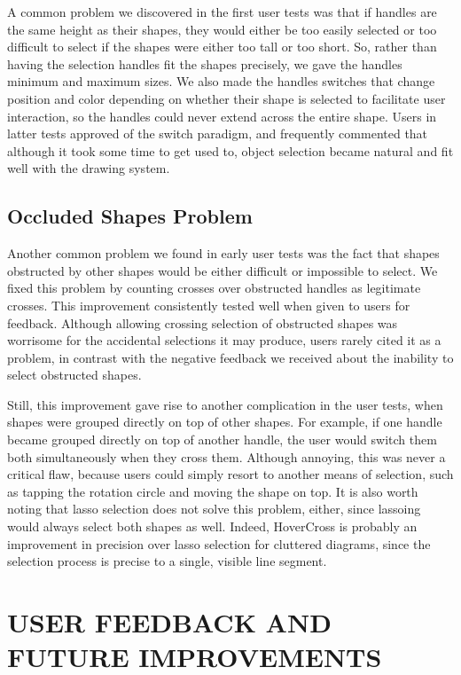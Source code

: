 \documentclass{article}
\begin{document}
A common problem we discovered in the first user tests was that if handles are the same height as their shapes, they would either be too easily selected or too difficult to select if the shapes were either too tall or too short.  So, rather than having the selection handles fit the shapes precisely, we gave the handles minimum and maximum sizes.  We also made the handles switches that change position and color depending on whether their shape is selected to facilitate user interaction, so the handles could never extend across the entire shape.  Users in latter tests approved of the switch paradigm, and frequently commented that although it took some time to get used to, object selection became natural and fit well with the drawing system.

\subsection{Occluded Shapes Problem}

Another common problem we found in early user tests was the fact that shapes obstructed by other shapes would be either difficult or impossible to select.  We fixed this problem by counting crosses over obstructed handles as legitimate crosses.  This improvement consistently tested well when given to users for feedback.  Although allowing crossing selection of obstructed shapes was worrisome for the accidental selections it may produce, users rarely cited it as a problem, in contrast with the negative feedback we received about the inability to select obstructed shapes.

Still, this improvement gave rise to another complication in the user tests, when shapes were grouped directly on top of other shapes.  For example, if one handle became grouped directly on top of another handle, the user would switch them both simultaneously when they cross them.  Although annoying, this was never a critical flaw, because users could simply resort to another means of selection, such as tapping the rotation circle and moving the shape on top.  It is also worth noting that lasso selection does not solve this problem, either, since lassoing would always select both shapes as well.  Indeed, HoverCross is probably an improvement in precision over lasso selection for cluttered diagrams, since the selection process is precise to a single, visible line segment.

\section{USER FEEDBACK AND FUTURE IMPROVEMENTS}
\end{document}
